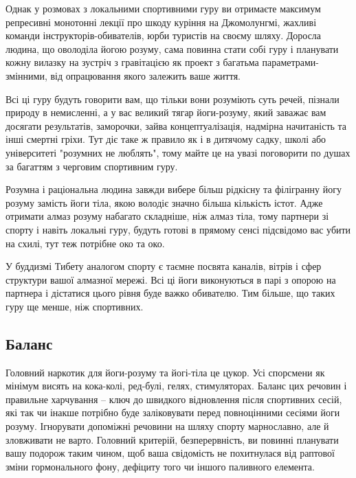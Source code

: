 Однак у розмовах з локальними спортивними гуру
ви отримаєте максимум репресивні монотонні лекції
про шкоду куріння на Джомолунгмі, жахливі команди
інструкторів-обивателів, юрби туристів на своєму
шляху. Доросла людина, що оволоділа йогою розуму,
сама повинна стати собі гуру і планувати кожну
вилазку на зустріч з гравітацією як проект з
багатьма параметрами-змінними, від опрацювання
якого залежить ваше життя.

Всі ці гуру будуть говорити вам, що тільки вони
розуміють суть речей, пізнали природу в немисленні,
а у вас великий тягар йоги-розуму, який заважає
вам досягати результатів, заморочки, зайва
концептуалізація, надмірна начитаність та інші
смертні гріхи. Тут діє таке ж правило як і в
дитячому садку, школі або університеті "розумних
не люблять", тому майте це на увазі поговорити
по душах за багаттям з черговим спортивним гуру.

Розумна і раціональна людина завжди вибере більш
рідкісну та філігранну йогу розуму замість йоги
тіла, якою володіє значно більша кількість істот.
Адже отримати алмаз розуму набагато складніше,
ніж алмаз тіла, тому партнери зі спорту і навіть
локальні гуру, будуть готові в прямому сенсі
підсвідомо вас убити на схилі, тут теж потрібне око та око.

У буддизмі Тибету аналогом спорту є таємне
посвята каналів, вітрів і сфер структури вашої
алмазної мережі. Всі ці йоги виконуються в парі
з опорою на партнера і дістатися цього рівня буде
важко обивателю. Тим більше, що таких гуру ще
менше, ніж спортивних.

\subsection{Баланс}

Головний наркотик для йоги-розуму та йогі-тіла
це цукор. Усі спорсмени як мінімум висять на
кока-колі, ред-булі, гелях, стимуляторах. Баланс
цих речовин і правильне харчування – ключ до
 швидкого відновлення після спортивних сесій,
які так чи інакше потрібно буде заліковувати
перед повноцінними сесіями йоги розуму. Ігнорувати
допоміжні  речовини на шляху спорту марнославно, але
й зловживати не варто. Головний критерій,
безперервність, ви повинні планувати вашу
подорож таким чином, щоб ваша свідомість
не похитнулася від раптової зміни гормонального
фону, дефіциту того чи іншого паливного елемента.

\normalsize
